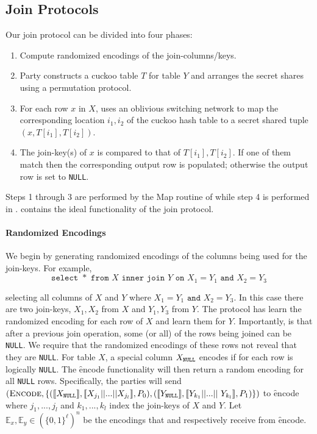 \subsection{Join Protocols}\label{sec:join}

Our join protocol can be divided into four phases:

\begin{enumerate}
	\item Compute randomized encodings of the join-columns/keys. 
	\item Party  constructs a cuckoo table $T$ for table $Y$ and arranges the secret shares using a permutation protocol. 
	\item For each row $x$ in $X$,  uses an oblivious switching network to map  the corresponding location $i_1,i_2$ of the cuckoo hash table to a secret shared tuple $(x, T[{i_1}], T[{i_2}])$.
	\item The join-key(s) of $x$ is compared to that of $T[{i_1}], T[{i_2}]$. If one of them match then the corresponding output row is populated; otherwise the output row is set to \texttt{NULL}.
\end{enumerate} 
Steps 1 through 3 are performed by the Map routine of  while step 4 is performed in .  contains the ideal functionality of the join protocol.



\paragraph{Randomized Encodings}
We begin by generating randomized encodings of the columns being used for the join-keys. For example, 
\iffullversion
$$
	\texttt{select }* \texttt{ from } X \texttt{ inner join } Y \texttt{ on } X_1 = Y_1 \texttt{ and } X_2 = Y_3
$$

\else
selecting all columns of $X$ and $Y$ where $X_1 = Y_1 \texttt{ and } X_2 = Y_3$.
\fi
In this case there are two join-keys, $X_1,X_2$ from $X$ and $Y_1,Y_3$ from $Y$. The protocol has  learn the randomized encoding for each row of $X$ and  learn them for $Y$. Importantly, is that after a previous join operation, some (or all) of the rows being joined can be \texttt{NULL}. We require that the randomized encodings of these rows not reveal that they are \texttt{NULL}. For table $X$, a special column $X_\texttt{NULL}$ encodes if for each row is logically \texttt{NULL}. The \f{encode} functionality will then return a random encoding for all \texttt{NULL} rows. Specifically, the parties will send $(\textsc{Encode}, \{(\share{\XNull}, \share{X_{j_1}||...||X_{j_l}}, \Party{0}), (\share{\YNull}, \share{Y_{k_1}||...||$ $Y_{k_l}}, \Party{1})\})$ to \f{encode} where $j_1,...,j_l$ and $k_1,...,k_l$ index the join-keys of $X$ and $Y$. Let $\mathbb{E}_x,\mathbb{E}_y\in(\{0,1\}^{\ell})^n$ be the encodings that  and  respectively receive from \f{encode}.


